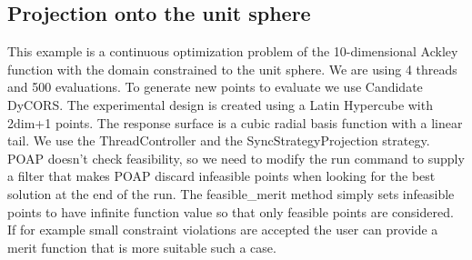 \documentclass[]{article}
\begin{document}
\subsection{Projection onto the unit sphere}
This example is a continuous optimization problem of the 10-dimensional Ackley function with the domain constrained to the unit sphere. We are using 4 threads and 500 evaluations. To generate new points to evaluate we use Candidate DyCORS. The experimental design is created using a Latin Hypercube with 2dim+1 points. The response surface is a cubic radial basis function with a linear tail. We use the ThreadController and the SyncStrategyProjection strategy. POAP doesn't check feasibility, so we need to modify the run command to supply a filter that makes POAP discard infeasible points when looking for the best solution at the end of the run. The feasible\_merit method simply sets infeasible points to have infinite function value so that only feasible points are considered. If for example small constraint violations are accepted the user can provide a merit function that is more suitable such a case.
\end{document}
